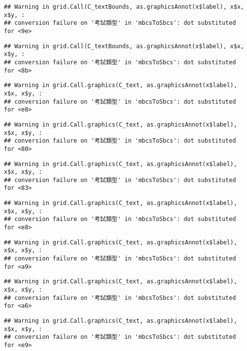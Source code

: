 \documentclass[
]{book}
\begin{document}
\begin{verbatim}
## Warning in grid.Call(C_textBounds, as.graphicsAnnot(x$label), x$x, x$y, :
## conversion failure on '考試類型' in 'mbcsToSbcs': dot substituted for <9e>
\end{verbatim}

\begin{verbatim}
## Warning in grid.Call(C_textBounds, as.graphicsAnnot(x$label), x$x, x$y, :
## conversion failure on '考試類型' in 'mbcsToSbcs': dot substituted for <8b>
\end{verbatim}

\begin{verbatim}
## Warning in grid.Call.graphics(C_text, as.graphicsAnnot(x$label), x$x, x$y, :
## conversion failure on '考試類型' in 'mbcsToSbcs': dot substituted for <e8>
\end{verbatim}

\begin{verbatim}
## Warning in grid.Call.graphics(C_text, as.graphicsAnnot(x$label), x$x, x$y, :
## conversion failure on '考試類型' in 'mbcsToSbcs': dot substituted for <80>
\end{verbatim}

\begin{verbatim}
## Warning in grid.Call.graphics(C_text, as.graphicsAnnot(x$label), x$x, x$y, :
## conversion failure on '考試類型' in 'mbcsToSbcs': dot substituted for <83>
\end{verbatim}

\begin{verbatim}
## Warning in grid.Call.graphics(C_text, as.graphicsAnnot(x$label), x$x, x$y, :
## conversion failure on '考試類型' in 'mbcsToSbcs': dot substituted for <e8>
\end{verbatim}

\begin{verbatim}
## Warning in grid.Call.graphics(C_text, as.graphicsAnnot(x$label), x$x, x$y, :
## conversion failure on '考試類型' in 'mbcsToSbcs': dot substituted for <a9>
\end{verbatim}

\begin{verbatim}
## Warning in grid.Call.graphics(C_text, as.graphicsAnnot(x$label), x$x, x$y, :
## conversion failure on '考試類型' in 'mbcsToSbcs': dot substituted for <a6>
\end{verbatim}

\begin{verbatim}
## Warning in grid.Call.graphics(C_text, as.graphicsAnnot(x$label), x$x, x$y, :
## conversion failure on '考試類型' in 'mbcsToSbcs': dot substituted for <e9>
\end{verbatim}
\end{document}
